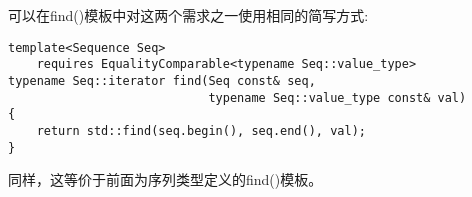 可以在find()模板中对这两个需求之一使用相同的简写方式:

\begin{lstlisting}[style=styleCXX]
template<Sequence Seq>
	requires EqualityComparable<typename Seq::value_type>
typename Seq::iterator find(Seq const& seq,
							typename Seq::value_type const& val)
{
	return std::find(seq.begin(), seq.end(), val);
}
\end{lstlisting}

同样，这等价于前面为序列类型定义的find()模板。





